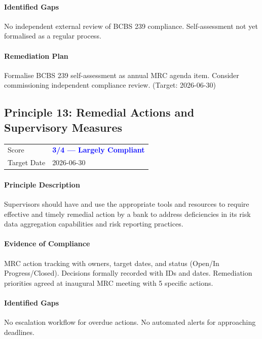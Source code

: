 \documentclass[11pt]{article}
\begin{document}
\paragraph{Identified Gaps}
No independent external review of BCBS 239 compliance. Self-assessment not yet formalised as a regular process.

\paragraph{Remediation Plan}
Formalise BCBS 239 self-assessment as annual MRC agenda item. Consider commissioning independent compliance review. (Target: 2026-06-30)

\subsection{Principle 13: Remedial Actions and Supervisory Measures}

\begin{table}[H]
    \centering
    \begin{tabular}{ll}
        \toprule
        Score & \textcolor{blue}{\textbf{3/4 --- Largely Compliant}} \\
        Target Date & 2026-06-30 \\
        \bottomrule
    \end{tabular}
\end{table}

\paragraph{Principle Description}
Supervisors should have and use the appropriate tools and resources to require effective and timely remedial action by a bank to address deficiencies in its risk data aggregation capabilities and risk reporting practices.

\paragraph{Evidence of Compliance}
MRC action tracking with owners, target dates, and status (Open/In Progress/Closed). Decisions formally recorded with IDs and dates. Remediation priorities agreed at inaugural MRC meeting with 5 specific actions.

\paragraph{Identified Gaps}
No escalation workflow for overdue actions. No automated alerts for approaching deadlines.
\end{document}
